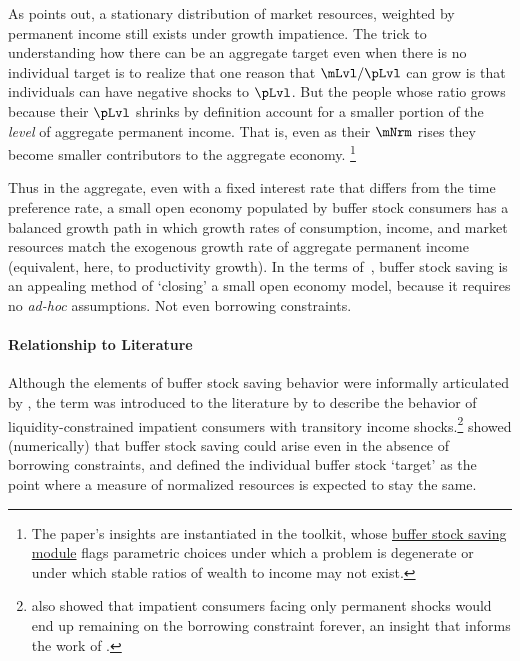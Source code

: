 \documentclass[BufferStockTheory]{subfiles}
\begin{document}
As \cite{harmenbergInvariant} points out, a stationary distribution of market resources, weighted by permanent income still exists under growth impatience. 
The trick to understanding how there can be an aggregate target even when there is no individual target is to realize that one reason that $\mLvl/\pLvl$ can grow is that individuals can have negative shocks to $\pLvl$.  But the people whose ratio grows because their $\pLvl$ shrinks by definition account for a smaller portion of the \textit{level} of aggregate permanent income. That is, even as their $\mNrm$ rises they become smaller contributors to the aggregate economy.  
\footnote{The paper's insights are instantiated in the {\ARKurl} toolkit, whose \href{https://hark.readthedocs.io/en/stable/reference/ConsumptionSaving/ConsIndShockModel.html}{buffer stock saving module} flags parametric choices under which a problem is degenerate or under which stable ratios of wealth to income may not exist.}

Thus in the aggregate, even with a fixed interest rate that differs from the time preference rate, a small open economy populated by buffer stock consumers has a balanced growth path in which growth rates of consumption, income, and market resources match the exogenous growth rate of aggregate permanent income (equivalent, here, to productivity growth).
In the terms of~\cite{schmitt2003closing}, buffer stock saving is an appealing method of `closing' a small open economy model, because it requires no \textit{ad-hoc} assumptions.
Not even borrowing constraints.


\vspace{-1em}

\hypertarget{cfLiterature}{}
\hypertarget{DiffFromLit}{} 
\paragraph{Relationship to Literature}


Although the elements of buffer stock saving behavior were informally articulated by \cite{friedmanATheory}, the term was introduced to the literature by \cite{deatonLiqConstr} to describe the behavior of liquidity-constrained impatient consumers with transitory income shocks.\footnote{\cite{deatonLiqConstr} also showed that impatient consumers facing only permanent shocks would end up remaining on the borrowing constraint forever, an insight that informs the work of \cite{kvwWealthyH2m}.} \cite{carroll:brookings} showed (numerically) that buffer stock saving could arise even in the absence of borrowing constraints, and defined the individual buffer stock `target' as the point where a measure of normalized resources is expected to stay the same.
\end{document}
